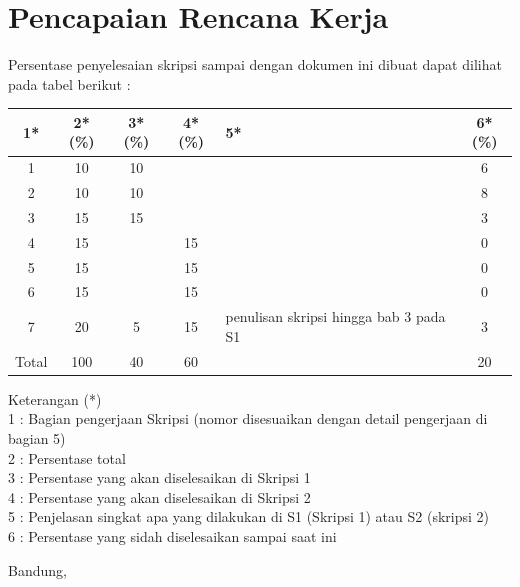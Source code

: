 \documentclass[a4paper,twoside]{article}
\begin{document}



\section{Pencapaian Rencana Kerja}
Persentase penyelesaian skripsi sampai dengan dokumen ini dibuat dapat dilihat pada tabel berikut :

\begin{center}
  \begin{tabular}{ | c | c | c | c | l | c |}
    \hline
    1*  & 2*(\%) & 3*(\%) & 4*(\%) &5* &6*(\%)\\ \hline \hline
    1   & 10 & 10 &    &  & 6 \\ \hline
    2   & 10 & 10 &    &  & 8 \\ \hline
    3   & 15 & 15 &    &  & 3 \\ \hline
    4   & 15 &    & 15 &  & 0 \\ \hline
    5   & 15 &    & 15 &  & 0 \\ \hline
    6   & 15 &    & 15 &  & 0 \\ \hline
    7   & 20 & 5  & 15 & {\footnotesize penulisan skripsi hingga bab 3 pada S1} & 3 \\ \hline
    Total  & 100  & 40  & 60 &  & 20\\ \hline
                          \end{tabular}
\end{center}

Keterangan (*)\\
1 : Bagian pengerjaan Skripsi (nomor disesuaikan dengan detail pengerjaan di bagian 5)\\
2 : Persentase total \\
3 : Persentase yang akan diselesaikan di Skripsi 1 \\
4 : Persentase yang akan diselesaikan di Skripsi 2 \\
5 : Penjelasan singkat apa yang dilakukan di S1 (Skripsi 1) atau S2 (skripsi 2)\\
6 : Persentase yang sidah diselesaikan sampai saat ini 

\vspace{1cm}
\centering Bandung, \tanggal\\
\vspace{2cm} \nama \\ 
\vspace{1cm}
\end{document}
